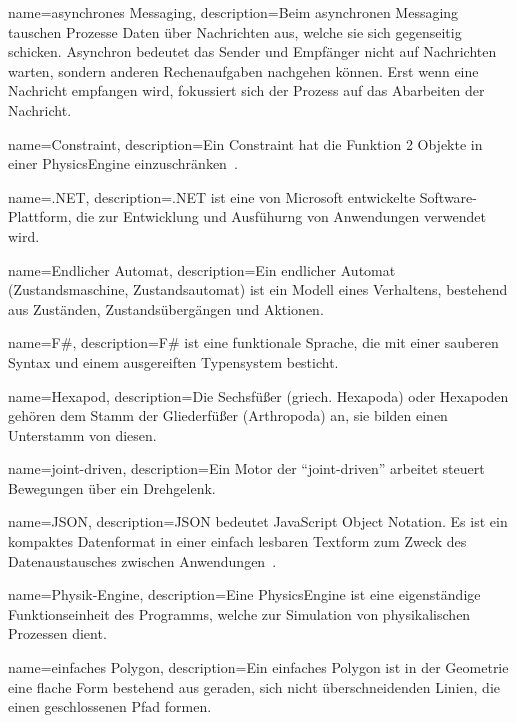 %
%


%
%

%
%
{
  name={asynchrones Messaging},
  description={Beim asynchronen Messaging tauschen Prozesse Daten über Nachrichten aus,
    welche sie sich gegenseitig schicken.
    Asynchron bedeutet das Sender und Empfänger nicht auf Nachrichten warten,
    sondern anderen Rechenaufgaben nachgehen können.
    Erst wenn eine Nachricht empfangen wird, fokussiert sich der Prozess auf das Abarbeiten der Nachricht.}
}

{
  name={Constraint},
  description={Ein Constraint hat die Funktion 2 Objekte in einer \gls{PhysicsEngine} einzuschränken~\cite{gamedev:constraints}.}
}

{
  name={.NET},
  description={.NET ist eine von Microsoft entwickelte Software-Plattform,
    die zur Entwicklung und Ausfühurng von Anwendungen verwendet wird.}
}

{
  name={Endlicher Automat},
  description={Ein endlicher Automat (Zustandsmaschine, Zustandsautomat) ist ein Modell eines Verhaltens,
    bestehend aus Zuständen, Zustandsübergängen und Aktionen.}
}

{
  name={F\#},
  description={F\# ist eine funktionale Sprache,
    die mit einer sauberen Syntax und einem ausgereiften Typensystem besticht.}
}

{
  name={Hexapod},
  description={Die Sechsfüßer (griech. Hexapoda) oder Hexapoden
    gehören dem Stamm der Gliederfüßer (Arthropoda) an,
    sie bilden einen Unterstamm von diesen.}
}

{
  name={joint-driven},
  description={Ein Motor der ``joint-driven'' arbeitet steuert Bewegungen über ein Drehgelenk.}
}

{
  name={JSON},
  description={JSON bedeutet JavaScript Object Notation.
    Es ist ein kompaktes Datenformat in einer einfach lesbaren Textform
    zum Zweck des Datenaustausches zwischen Anwendungen~\cite{json}.}
}

{
  name={Physik-Engine},
  description={Eine \gls{PhysicsEngine} ist eine eigenständige Funktionseinheit des Programms,
    welche zur Simulation von physikalischen Prozessen dient.}
}

{
  name={einfaches Polygon},
  description={Ein einfaches Polygon ist in der Geometrie eine flache Form bestehend aus geraden,
    sich nicht überschneidenden Linien, die einen geschlossenen Pfad formen.}
}
